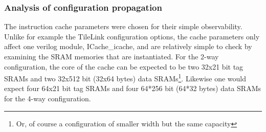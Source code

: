 \documentclass[journal,a4paper]{IEEEtran}
\makeatletter
\newcommand\footnoteref[1]{\protected@xdef\@thefnmark{\ref{#1}}\@footnotemark}
\makeatother
\begin{document}
\subsubsection{Analysis of configuration propagation}
The instruction cache parameters were chosen for their simple observability. Unlike for example the TileLink configuration options, the cache parameters only affect one verilog module, ICache\_icache, and are relatively simple to check by examining the SRAM memories that are instantiated.
For the 2-way configuration, the core of the cache can be expected to be two 32x21 bit tag SRAMs and two 32x512 bit (32x64 bytes) data SRAMs\footnote{\label{note-width}Or, of course a configuration of smaller width but the same capacity}.
Likewise one would expect four 64x21 bit tag SRAMs and four 64*256 bit (64*32 bytes) data SRAMs\footnoteref{note-width} for the 4-way configuration.

\end{document}
